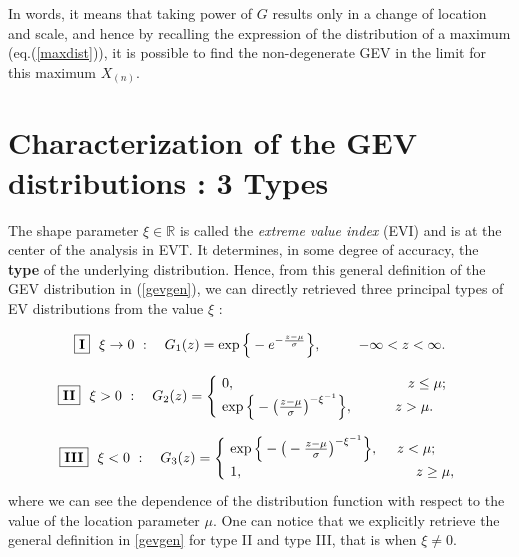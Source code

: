 \documentclass[11pt,a4paper,openany ]{book}
\begin{document}
In words, it means that taking power of $G$ results only in a change of location and scale, and hence by recalling the expression of the distribution of a maximum (eq.(\ref{maxdist})), it is possible to find the non-degenerate GEV in the limit for this maximum $X_{(n)}$.

\section{Characterization of the GEV distributions : 3 Types}\label{sec:gevdistri}

The shape parameter $\xi\in\mathbb{R}$ is called the \emph{extreme value index} (EVI) and is at the center of the analysis in EVT. It determines, in some degree of accuracy, the \textbf{type} of the underlying distribution.
Hence, from this general definition of the GEV distribution in (\ref{gevgen}), we can directly retrieved three principal types of EV distributions from the value $\xi$ :

\begin{equation}\label{gumb}
\boxed{\textbf{\text{I}}}\ \  \xi \to 0 \ : \quad G_{1}(z)= 
\exp\Big\{-e^{-\frac{z-\mu}{\sigma}}\Big\}, \ \ \quad \ \ \ -\infty<z<\infty.    
\end{equation}


\begin{equation} \label{frech}
\boxed{\textbf{\text{II}}} \ \  \xi> 0 \ : \quad G_{2}(z)=
\begin{cases}
\ 0, \ \ \ \ \ \ \ \ \ \ \ \qquad \quad \ \ \ \ \ \ \ \ \ \ \ \ \quad \ \ z\leq \mu; \\
\ \exp\Big\{-\big(\frac{z-\mu}{\sigma}\big)^{-\xi^{-1}}\Big\}, \ \ \ \ \ \ \ \ \ z>\mu.    
\end{cases}
\end{equation}

\begin{equation} \label{weib}
\ \ \boxed{\textbf{\text{III}}} \ \ \xi<0 \ : \quad G_{3}(z)=\begin{cases}
\ \exp\Big\{-\big(-\frac{z-\mu}{\sigma}\big)^{-\xi^{-1}}\Big\}, \ \ \ \  z<\mu;     \\
\  1, \ \ \ \ \ \ \qquad \quad \quad \ \ \ \ \ \ \ \ \ \ \ \ \ \ \ \ \quad z\geq \mu,
\end{cases}
\end{equation}
where we can see the dependence of the distribution function with respect to the value of the location parameter $\mu$. One can notice that we explicitly retrieve the general definition in \ref{gevgen} for type II and type III, that is when $\xi\neq 0$.
\end{document}
